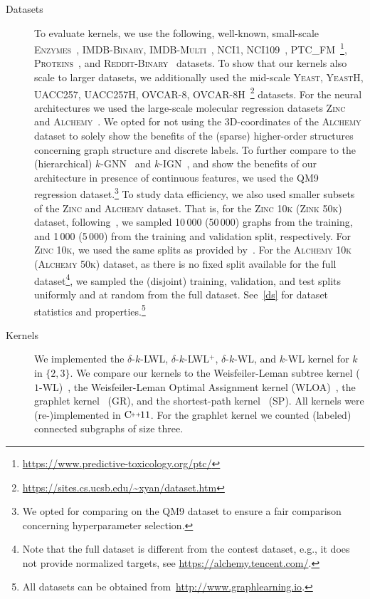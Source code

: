 \documentclass{article}
\theoremstyle{definition}
\newcommand{\CC}[1][]{$\text{C\hspace{-.25ex}}^{_{_{_{++}}}}
	\ifthenelse{\equal{#1}{}}{}{\text{\hspace{-.625ex}#1}}$}
\newcommand{\wl}{$1$-\textsf{WL}\xspace}
\newcommand{\kwl}{$k$-\textsf{WL}\xspace}
\newcommand{\deltakwl}{$\delta$-$k$-\textsf{WL}\xspace}
\newcommand{\localkwl}{$\delta$-$k$-\textsf{LWL}\xspace}
\newcommand{\pluskwl}{$\delta$-$k$-\textsf{LWL}$^+$\xspace}
\newcommand{\kgnn}{$k$\textrm{-}\textsf{GNN}\xspace}
\newcommand{\kign}{$k$\textrm{-}\textsf{IGN}\xspace}
\newcommand{\shp}{\textsf{SP}\xspace}
\newcommand{\gr}{\textsf{GR}\xspace}
\newcommand{\wloa}{\textsf{WLOA}\xspace}
\begin{document}
\begin{description}
	\item[Datasets] To evaluate kernels, we use the following, well-known, small-scale \textsc{Enzymes}~\cite{Sch+2004,Bor+2005}, \textsc{IMDB-Binary}, \textsc{IMDB-Multi}~\cite{Yan+2015a}, \textsc{NCI1}, \textsc{NCI109}~\cite{Wal+2008}, \textsc{PTC\_FM}~\cite{Hel+2001}\footnote{\url{https://www.predictive-toxicology.org/ptc/}}, \textsc{Proteins}~\cite{Dob+2003,Bor+2005}, and \textsc{Reddit-Binary}~\cite{Yan+2015a} datasets. To show that our kernels also scale to larger datasets, we additionally used the mid-scale \textsc{Yeast}, \textsc{YeastH}, \textsc{UACC257}, \textsc{UACC257H}, \textsc{OVCAR-8}, \textsc{OVCAR-8H}~\cite{Yan+2008}\footnote{\url{https://sites.cs.ucsb.edu/~xyan/dataset.htm}} datasets. For the neural architectures we used the large-scale molecular regression datasets \textsc{Zinc}~\cite{Dwi+2020,Jin+2018a} and \textsc{Alchemy}~\cite{Che+2020}.
	We opted for not using the 3D-coordinates of the \textsc{Alchemy} dataset to solely show the benefits of the (sparse) higher-order structures concerning graph structure and discrete labels.
	To further compare to the (hierarchical) \kgnn~\cite{Mor+2019} and \kign~\cite{Mar+2019}, and show the benefits of our architecture in presence of continuous features, we used the \textsc{QM9}~\cite{Ram+2014,Wu+2018} regression dataset.\footnote{We opted for comparing on the \textsc{QM9} dataset to ensure a fair comparison concerning hyperparameter selection.}
	To study data efficiency, we also used smaller subsets of the \textsc{Zinc} and \textsc{Alchemy} dataset. That is, for the \textsc{Zinc 10k} (\textsc{Zink 50k}) dataset, following~\cite{Dwi+2020}, we sampled 10\,000 (50\,000) graphs from the training, and 1\,000 (5\,000) from the training and validation split, respectively. For \textsc{Zinc 10k}, we used the same splits as provided by~\cite{Dwi+2020}. For the \textsc{Alchemy 10k} (\textsc{Alchemy 50k}) dataset, as there is no fixed split available for the full dataset\footnote{Note that the full dataset is different from the contest dataset, e.g., it does not provide normalized targets, see \url{https://alchemy.tencent.com/}.}, we sampled the (disjoint) training, validation, and test splits uniformly and at random from the full dataset. See~\cref{ds} for dataset statistics and properties.\footnote{All datasets can be obtained from~\url{http://www.graphlearning.io}.} 
	
	\item[Kernels] We implemented the \localkwl, \pluskwl, \deltakwl, and  \kwl kernel for $k$ in $\{2,3\}$. We compare our kernels to the Weisfeiler-Leman subtree kernel (\wl)~\cite{She+2011}, the Weisfeiler-Leman Optimal Assignment kernel (\wloa)~\cite{Kri+2016}, the graphlet kernel~\cite{She+2009} (\gr), and the shortest-path kernel~\cite{Bor+2005} (\shp). All kernels were (re-)implemented in \CC[11]. For the graphlet kernel we counted (labeled) connected subgraphs of size three. 
	

\end{description}
\end{document}
